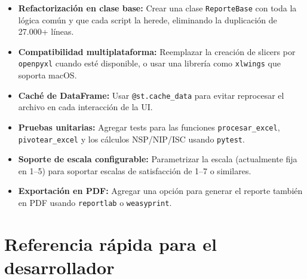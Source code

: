 \documentclass[12pt, letterpaper]{article}
\begin{document}
\begin{itemize}[leftmargin=1.5cm]
  \item \textbf{Refactorización en clase base:} Crear una clase \texttt{ReporteBase} con toda la lógica común y que cada script la herede, eliminando la duplicación de 27.000+ líneas.
  \item \textbf{Compatibilidad multiplataforma:} Reemplazar la creación de slicers por \texttt{openpyxl} cuando esté disponible, o usar una librería como \texttt{xlwings} que soporta macOS.
  \item \textbf{Caché de DataFrame:} Usar \texttt{@st.cache\_data} para evitar reprocesar el archivo en cada interacción de la UI.
  \item \textbf{Pruebas unitarias:} Agregar tests para las funciones \texttt{procesar\_excel}, \texttt{pivotear\_excel} y los cálculos NSP/NIP/ISC usando \texttt{pytest}.
  \item \textbf{Soporte de escala configurable:} Parametrizar la escala (actualmente fija en 1--5) para soportar escalas de satisfacción de 1--7 o similares.
  \item \textbf{Exportación en PDF:} Agregar una opción para generar el reporte también en PDF usando \texttt{reportlab} o \texttt{weasyprint}.
\end{itemize}

\section{Referencia rápida para el desarrollador}
\end{document}
